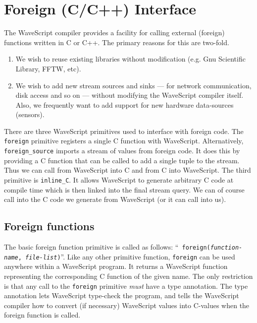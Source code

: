 
\chapter{Foreign (C/C++) Interface}

The WaveScript compiler provides a facility for calling external
(foreign) functions written in C or C++.  The primary reasons for this
are two-fold.

\begin{enumerate}
\item We wish to reuse existing libraries without modification (e.g. Gnu
  Scientific Library, FFTW, etc).

\item We wish to add new stream sources and sinks --- for network communication, disk access and so
  on --- without modifying the WaveScript compiler itself.  Also, we
  frequently want to add support for new hardware data-sources
  (sensors).
  
\end{enumerate}

There are three WaveScript primitives used to interface with foreign
code.  The {\tt foreign} primitive registers a single C function with
WaveScript.  Alternatively, {\tt foreign\_source} imports a stream of
values from foreign code.  It does this by providing a C function that
can be called to add a single tuple to the stream.  Thus we can call
from WaveScript into C and from C into WaveScript.  The third
primitive is {\tt inline\_C}.  It allows WaveScript to generate
arbitrary C code at compile time which is then linked into the final
stream query.  We can of course call into the C code we generate from
WaveScript (or it can call into us).




\section{Foreign functions}

The basic foreign function primitive is called as follows: ``{\tt
foreign({\em function-name}, {\em file-list})}''.  Like any other
primitive function, {\tt foreign} can be used anywhere within a
WaveScript program.  It returns a WaveScript function representing the
corresponding C function of the given name.  The only restriction is
that any call to the {\tt foreign} primitive {\em must} have a type
annotation.  The type annotation lets WaveScript type-check the
program, and tells the WaveScript compiler how to convert (if
necessary) WaveScript values into C-values when the foreign function
is called.  

